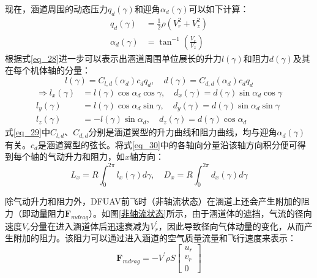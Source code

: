 现在，涵道周围的动态压力$q_d(\gamma)$和迎角$\alpha_d(\gamma)$可以如下计算：
\begin{equation}
    \begin{aligned}
        q_d(\gamma)&=\frac{1}{2}\rho\left(V_r^2+V_z^2\right)\\
        \alpha_d(\gamma)&=\tan^{-1}\left(\frac{V_r}{V_z}\right)
    \label{eq_28}
    \end{aligned}
\end{equation}
根据式\eqref{eq_28}进一步可以表示出涵道周围单位展长的升力$l(\gamma)$和阻力$d(\gamma)$及其在每个机体轴的分量：
\begin{equation}
        l(\gamma)=C_{l,d}(\alpha_d)c_dq_d, \quad
        d(\gamma)=C_{d,d}(\alpha_d)c_dq_d
    \label{eq_29}
\end{equation}
\begin{equation}
        \begin{aligned}
            \Rightarrow
        l_{x}(\gamma)&=l(\gamma)\cos\alpha_d\cos\gamma,\quad d_x(\gamma)=d(\gamma)\sin\alpha_d\cos\gamma \\
        l_{y}(\gamma)&=l(\gamma)\cos\alpha_d\sin\gamma,\quad d_y(\gamma)=d(\gamma)\sin\alpha_d\sin\gamma \\
        l_{z}(\gamma)&=-l(\gamma)\sin\alpha_d,\quad d_z(\gamma)=d(\gamma)\cos\alpha_d
        \label{eq_30}
    \end{aligned}
\end{equation}
式\eqref{eq_29}中$C_{l,d}$、$C_{d,d}$分别是涵道翼型的升力曲线和阻力曲线，均与迎角$\alpha_d(\gamma)$有关。$c_d$是涵道翼型的弦长。将式\eqref{eq_30}中的各轴向分量沿该轴方向积分便可得到每个轴的气动升力和阻力，如$x$轴方向：
\begin{equation}
    L_x=R\int_0^{2\pi}l_x(\gamma)d\gamma, \quad
    D_x=R\int_0^{2\pi}d_x(\gamma)d\gamma
    \label{eq_31}
\end{equation}

除气动升力和阻力外，DFUAV前飞时（非轴流状态）在涵道上还会产生附加的阻力（即动量阻力$\boldsymbol{F}_{mdrag}$\cite{choiStaticAnalysisSmall2012}）。如图\ref{非轴流状态}所示，由于涵道体的遮挡，气流的径向速度$V_r$分量在进入涵道体后迅速衰减为$V_r^\prime$，因此导致径向气体动量的变化，从而产生附加的阻力。该阻力可以通过进入涵道的空气质量流量和飞行速度来表示：
\begin{equation}
    \boldsymbol{F}_{mdrag}=-V^\prime\rho{S}
    \begin{bmatrix}u_r \\v_r \\0
    \end{bmatrix}
    \label{eq_32}
\end{equation}

